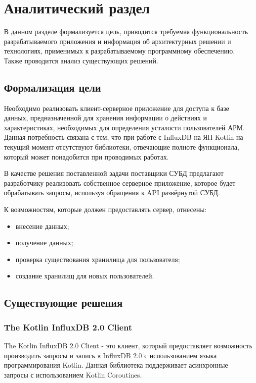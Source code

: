 \section{Аналитический раздел}
В данном разделе формализуется цель, приводится требуемая функциональность разрабатываемого приложения и информация об архитектурных решении и технологиях, применимых к разрабатываемому программному обеспечению. Также проводится анализ существующих решений.

\subsection{Формализация цели}
Необходимо реализовать клиент-серверное приложение для доступа к базе данных, предназначенной для хранения информации о действиях и характеристиках, необходимых для определения усталости пользователей АРМ. Данная потребность связана с тем, что при работе с InfluxDB на ЯП Kotlin на текущий момент отсутствуют библиотеки, отвечающие полноте функционала, который может понадобится при проводимых работах.

В качестве решения поставленной задачи поставщики СУБД предлагают разработчику реализовать собственное серверное приложение, которое будет обрабатывать запросы, используя обращения к API развёрнутой СУБД.

К возможностям, которые должен предоставлять сервер, отнесены:
\begin{itemize}[leftmargin=1.6\parindent]
\item внесение данных;
\item получение данных;
\item проверка существования хранилища для пользователя;
\item создание хранилищ для новых пользователей.
\end{itemize}

\subsection{Существующие решения}
\subsubsection{The Kotlin InfluxDB 2.0 Client}
The Kotlin InfluxDB 2.0 Client \cite{influxClient} - это клиент, который предоставляет возможность производить запросы и запись в InfluxDB 2.0 с использованием языка программирования Kotlin. Данная библиотека поддерживает асинхронные запросы с использованием Kotlin Coroutines.

